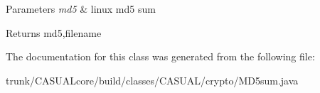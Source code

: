 \begin{DoxyParams}{Parameters}
{\em md5} & linux md5 sum \\
\hline
\end{DoxyParams}
\begin{DoxyReturn}{Returns}
md5,filename 
\end{DoxyReturn}


The documentation for this class was generated from the following file\-:\begin{DoxyCompactItemize}
\item 
trunk/\-C\-A\-S\-U\-A\-Lcore/build/classes/\-C\-A\-S\-U\-A\-L/crypto/M\-D5sum.\-java\end{DoxyCompactItemize}
